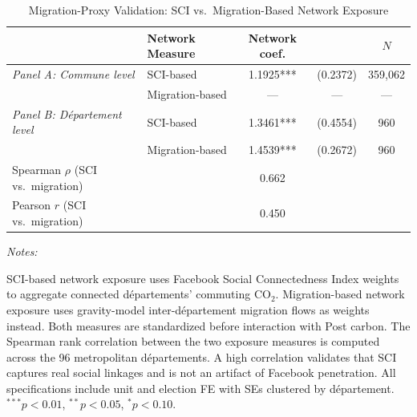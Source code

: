 \begin{table}[!h]
\centering
\caption{Migration-Proxy Validation: SCI vs.\ Migration-Based Network Exposure}
\centering
\fontsize{10}{12}\selectfont
\begin{threeparttable}
\begin{tabular}[t]{llccc}
\toprule
 & Network Measure & Network coef. &  & $N$\\
\midrule
\textit{Panel A: Commune level} & SCI-based & 1.1925*** & (0.2372) & 359,062\\
 & Migration-based & --- & --- & ---\\
\textit{Panel B: D\'{e}partement level} & SCI-based & 1.3461*** & (0.4554) & 960\\
 & Migration-based & 1.4539*** & (0.2672) & 960\\
\midrule Spearman $\rho$ (SCI vs.\ migration) &  & 0.662 &  & \\
Pearson $r$ (SCI vs.\ migration) &  & 0.450 &  & \\
\bottomrule
\end{tabular}
\begin{tablenotes}
\item \textit{Notes:} 
\item SCI-based network exposure uses Facebook Social Connectedness Index weights to aggregate connected d\'{e}partements' commuting CO$_2$. Migration-based network exposure uses gravity-model inter-d\'{e}partement migration flows as weights instead. Both measures are standardized before interaction with Post carbon. The Spearman rank correlation between the two exposure measures is computed across the 96 metropolitan d\'{e}partements. A high correlation validates that SCI captures real social linkages and is not an artifact of Facebook penetration. All specifications include unit and election FE with SEs clustered by d\'{e}partement. $^{***}p<0.01$, $^{**}p<0.05$, $^{*}p<0.10$.
\end{tablenotes}
\end{threeparttable}
\end{table}
